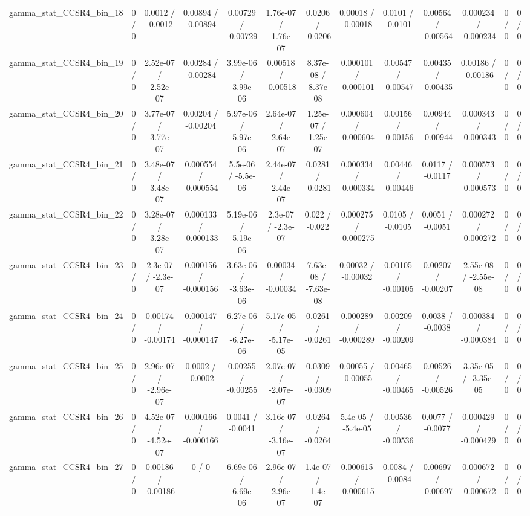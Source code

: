 \documentclass[10pt]{article}
\begin{document}
\begin{table}[htbp]
\begin{center}
\begin{tabular}{|c|c|c|c|c|c|c|c|c|c|c|c|c|}
  gamma_stat_CCSR4_bin_18 & 0 / 0 & 0.0012 / -0.0012 & 0.00894 / -0.00894 & 0.00729 / -0.00729 & 1.76e-07 / -1.76e-07 & 0.0206 / -0.0206 & 0.00018 / -0.00018 & 0.0101 / -0.0101 & 0.00564 / -0.00564 & 0.000234 / -0.000234 & 0 / 0 & 0 / 0 \\ 
  gamma_stat_CCSR4_bin_19 & 0 / 0 & 2.52e-07 / -2.52e-07 & 0.00284 / -0.00284 & 3.99e-06 / -3.99e-06 & 0.00518 / -0.00518 & 8.37e-08 / -8.37e-08 & 0.000101 / -0.000101 & 0.00547 / -0.00547 & 0.00435 / -0.00435 & 0.00186 / -0.00186 & 0 / 0 & 0 / 0 \\ 
  gamma_stat_CCSR4_bin_20 & 0 / 0 & 3.77e-07 / -3.77e-07 & 0.00204 / -0.00204 & 5.97e-06 / -5.97e-06 & 2.64e-07 / -2.64e-07 & 1.25e-07 / -1.25e-07 & 0.000604 / -0.000604 & 0.00156 / -0.00156 & 0.00944 / -0.00944 & 0.000343 / -0.000343 & 0 / 0 & 0 / 0 \\ 
  gamma_stat_CCSR4_bin_21 & 0 / 0 & 3.48e-07 / -3.48e-07 & 0.000554 / -0.000554 & 5.5e-06 / -5.5e-06 & 2.44e-07 / -2.44e-07 & 0.0281 / -0.0281 & 0.000334 / -0.000334 & 0.00446 / -0.00446 & 0.0117 / -0.0117 & 0.000573 / -0.000573 & 0 / 0 & 0 / 0 \\ 
  gamma_stat_CCSR4_bin_22 & 0 / 0 & 3.28e-07 / -3.28e-07 & 0.000133 / -0.000133 & 5.19e-06 / -5.19e-06 & 2.3e-07 / -2.3e-07 & 0.022 / -0.022 & 0.000275 / -0.000275 & 0.0105 / -0.0105 & 0.0051 / -0.0051 & 0.000272 / -0.000272 & 0 / 0 & 0 / 0 \\ 
  gamma_stat_CCSR4_bin_23 & 0 / 0 & 2.3e-07 / -2.3e-07 & 0.000156 / -0.000156 & 3.63e-06 / -3.63e-06 & 0.00034 / -0.00034 & 7.63e-08 / -7.63e-08 & 0.00032 / -0.00032 & 0.00105 / -0.00105 & 0.00207 / -0.00207 & 2.55e-08 / -2.55e-08 & 0 / 0 & 0 / 0 \\ 
  gamma_stat_CCSR4_bin_24 & 0 / 0 & 0.00174 / -0.00174 & 0.000147 / -0.000147 & 6.27e-06 / -6.27e-06 & 5.17e-05 / -5.17e-05 & 0.0261 / -0.0261 & 0.000289 / -0.000289 & 0.00209 / -0.00209 & 0.0038 / -0.0038 & 0.000384 / -0.000384 & 0 / 0 & 0 / 0 \\ 
  gamma_stat_CCSR4_bin_25 & 0 / 0 & 2.96e-07 / -2.96e-07 & 0.0002 / -0.0002 & 0.00255 / -0.00255 & 2.07e-07 / -2.07e-07 & 0.0309 / -0.0309 & 0.00055 / -0.00055 & 0.00465 / -0.00465 & 0.00526 / -0.00526 & 3.35e-05 / -3.35e-05 & 0 / 0 & 0 / 0 \\ 
  gamma_stat_CCSR4_bin_26 & 0 / 0 & 4.52e-07 / -4.52e-07 & 0.000166 / -0.000166 & 0.0041 / -0.0041 & 3.16e-07 / -3.16e-07 & 0.0264 / -0.0264 & 5.4e-05 / -5.4e-05 & 0.00536 / -0.00536 & 0.0077 / -0.0077 & 0.000429 / -0.000429 & 0 / 0 & 0 / 0 \\ 
  gamma_stat_CCSR4_bin_27 & 0 / 0 & 0.00186 / -0.00186 & 0 / 0 & 6.69e-06 / -6.69e-06 & 2.96e-07 / -2.96e-07 & 1.4e-07 / -1.4e-07 & 0.000615 / -0.000615 & 0.0084 / -0.0084 & 0.00697 / -0.00697 & 0.000672 / -0.000672 & 0 / 0 & 0 / 0 \\ 

\end{tabular}
\end{center}
\end{table}
\end{document}
